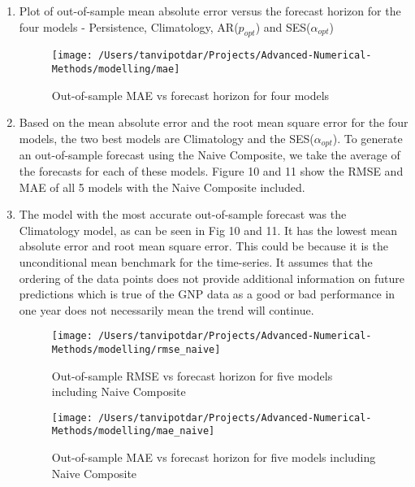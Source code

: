 \documentclass{article}
\begin{document}
\begin{enumerate}[label=1.\arabic*]
\begin{enumerate}[label=(\alph*)]
\begin{figure}[!htbp]
\end{figure}
\item Plot of out-of-sample mean absolute error versus the forecast horizon for the four models - Persistence, Climatology, AR($p_{opt}$) and SES($\alpha_{opt}$)
\begin{figure}[!htbp]
  \centering
  \vspace*{-1cm}
  \hspace*{-1cm}
  \texttt{[image: /Users/tanvipotdar/Projects/Advanced-Numerical-Methods/modelling/mae]}
   \caption{Out-of-sample MAE vs forecast horizon for four models}
\end{figure}
\item Based on the mean absolute error and the root mean square error for the four models, the two best models are Climatology and the SES($\alpha_{opt}$). To generate an out-of-sample forecast using the Naive Composite, we take the average of the forecasts for each of these models. Figure 10 and 11 show the RMSE and MAE of all 5 models with the Naive Composite included.
\item The model with the most accurate out-of-sample forecast was the Climatology model, as can be seen in Fig 10 and 11. It has the lowest mean absolute error and root mean square error. This could be because it is the unconditional mean benchmark for the time-series. It assumes that the ordering of the data points does not provide additional information on future predictions which is true of the GNP data as a good or bad performance in one year does not necessarily mean the trend will continue. 
\begin{figure}[!htbp]
    \centering
    \hspace*{-1cm}
    \texttt{[image: /Users/tanvipotdar/Projects/Advanced-Numerical-Methods/modelling/rmse\_naive]}
    \caption{Out-of-sample RMSE vs forecast horizon for five models including Naive Composite}
\end{figure}
\begin{figure}[!htbp]
  \centering
  \vspace*{-6.3cm}
  \hspace*{-1cm}
  \texttt{[image: /Users/tanvipotdar/Projects/Advanced-Numerical-Methods/modelling/mae\_naive]}
   \caption{Out-of-sample MAE vs forecast horizon for five models including Naive Composite}
\end{figure}
\end{enumerate}
\end{enumerate}
\end{document}
